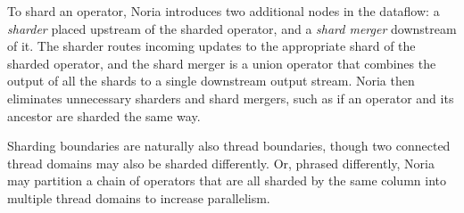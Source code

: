 To shard an operator, Noria introduces two additional nodes in the dataflow: a
\emph{sharder} placed upstream of the sharded operator, and a \emph{shard
merger} downstream of it. The sharder routes incoming updates to the appropriate
shard of the sharded operator, and the shard merger is a union operator that
combines the output of all the shards to a single downstream output stream.
Noria then eliminates unnecessary sharders and shard mergers, such as if an
operator and its ancestor are sharded the same way.

Sharding boundaries are naturally also thread boundaries, though two connected
thread domains may also be sharded differently. Or, phrased differently, Noria
may partition a chain of operators that are all sharded by the same column into
multiple thread domains to increase parallelism.

